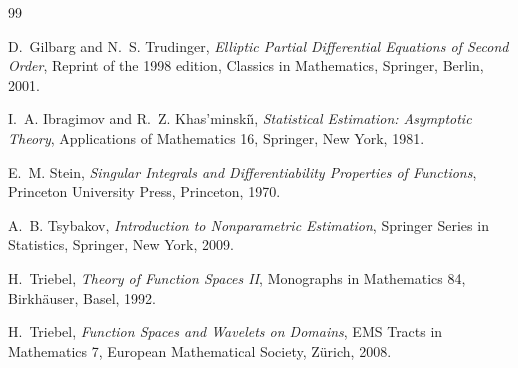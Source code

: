 \documentclass[11pt]{amsart}
\newcommand{\1}{\mathbf{1}}
\begin{document}
\begin{thebibliography}{99}

 D.~Gilbarg and N.~S. Trudinger,
\emph{Elliptic Partial Differential Equations of Second Order},
Reprint of the 1998 edition, Classics in Mathematics, Springer, Berlin, 2001.

 I.~A. Ibragimov and R.~Z. Khas'minski\v{\i},
\emph{Statistical Estimation: Asymptotic Theory},
Applications of Mathematics 16, Springer, New York, 1981.

 E.~M. Stein,
\emph{Singular Integrals and Differentiability Properties of Functions},
Princeton University Press, Princeton, 1970.

 A.~B. Tsybakov,
\emph{Introduction to Nonparametric Estimation},
Springer Series in Statistics, Springer, New York, 2009.

 H.~Triebel,
\emph{Theory of Function Spaces II},
Monographs in Mathematics 84, Birkh\"auser, Basel, 1992.

 H.~Triebel,
\emph{Function Spaces and Wavelets on Domains},
EMS Tracts in Mathematics 7, European Mathematical Society, Z\"urich, 2008.

\end{thebibliography}
\end{document}
